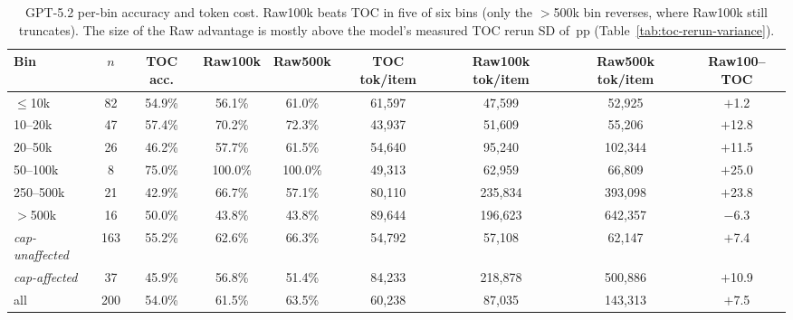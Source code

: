 \documentclass{article}
\begin{document}
\begin{table}[h]
\centering
\scriptsize
\setlength{\tabcolsep}{4pt}
\caption{GPT-5.2 per-bin accuracy and token cost. Raw100k beats TOC in five of six bins (only the $>$500k bin reverses, where Raw100k still truncates). The size of the Raw advantage is mostly above the model's measured TOC rerun SD of \GPTFiveTwoTOCRerunSD\,pp (Table~\ref{tab:toc-rerun-variance}).}
\label{tab:appendix-bin-gpt52}
\begin{tabular}{lcccccccc}
\toprule
Bin & $n$ & TOC acc. & Raw100k & Raw500k & TOC tok/item & Raw100k tok/item & Raw500k tok/item & Raw100--TOC \\
\midrule
$\le$10k & 82 & 54.9\% & 56.1\% & 61.0\% & 61{,}597 & 47{,}599 & 52{,}925 & $+$1.2 \\
10--20k & 47 & 57.4\% & 70.2\% & 72.3\% & 43{,}937 & 51{,}609 & 55{,}206 & $+$12.8 \\
20--50k & 26 & 46.2\% & 57.7\% & 61.5\% & 54{,}640 & 95{,}240 & 102{,}344 & $+$11.5 \\
50--100k & 8 & 75.0\% & 100.0\% & 100.0\% & 49{,}313 & 62{,}959 & 66{,}809 & $+$25.0 \\
250--500k & 21 & 42.9\% & 66.7\% & 57.1\% & 80{,}110 & 235{,}834 & 393{,}098 & $+$23.8 \\
$>$500k & 16 & 50.0\% & 43.8\% & 43.8\% & 89{,}644 & 196{,}623 & 642{,}357 & $-$6.3 \\
\midrule
\textit{cap-unaffected} & 163 & 55.2\% & 62.6\% & 66.3\% & 54{,}792 & 57{,}108 & 62{,}147 & $+$7.4 \\
\textit{cap-affected} & 37 & 45.9\% & 56.8\% & 51.4\% & 84{,}233 & 218{,}878 & 500{,}886 & $+$10.9 \\
all & 200 & 54.0\% & 61.5\% & 63.5\% & 60{,}238 & 87{,}035 & 143{,}313 & $+$7.5 \\
\bottomrule
\end{tabular}
\end{table}
\end{document}
